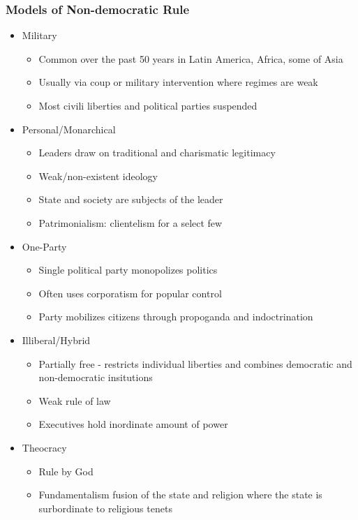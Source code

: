 \documentclass[11pt]{article}
\begin{document}
\subsubsection{Models of Non-democratic Rule}
\label{sec:org169d269}
\begin{itemize}
\item Military
\begin{itemize}
\item Common over the past 50 years in Latin America, Africa, some of Asia
\item Usually via coup or military intervention where regimes are weak
\item Most civili liberties and political parties suspended
\end{itemize}
\item Personal/Monarchical
\begin{itemize}
\item Leaders draw on traditional and charismatic legitimacy
\item Weak/non-existent ideology
\item State and society are subjects of the leader
\item Patrimonialism: clientelism for a select few
\end{itemize}
\item One-Party
\begin{itemize}
\item Single political party monopolizes politics
\item Often uses corporatism for popular control
\item Party mobilizes citizens through propoganda and indoctrination
\end{itemize}
\item Illiberal/Hybrid
\begin{itemize}
\item Partially free - restricts individual liberties and combines democratic and non-democratic insitutions
\item Weak rule of law
\item Executives hold inordinate amount of power
\end{itemize}
\item Theocracy
\begin{itemize}
\item Rule by God
\item Fundamentalism fusion of the state and religion where the state is surbordinate to religious tenets
\end{itemize}
\end{itemize}
\end{document}
